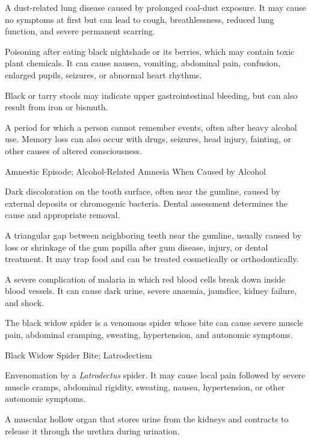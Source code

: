  A dust-related lung disease caused by prolonged coal-dust exposure. It may cause no symptoms at first but can lead to cough, breathlessness, reduced lung function, and severe permanent scarring.

 Poisoning after eating black nightshade or its berries, which may contain toxic plant chemicals. It can cause nausea, vomiting, abdominal pain, confusion, enlarged pupils, seizures, or abnormal heart rhythms.

 Black or tarry stools may indicate upper gastrointestinal bleeding, but can also result from iron or bismuth.

 A period for which a person cannot remember events, often after heavy alcohol use. Memory loss can also occur with drugs, seizures, head injury, fainting, or other causes of altered consciousness.

\synonyms
Amnestic Episode; Alcohol-Related Amnesia When Caused by Alcohol

 Dark discoloration on the tooth surface, often near the gumline, caused by external deposits or chromogenic bacteria. Dental assessment
determines the cause and appropriate removal.

 A triangular gap between neighboring teeth near the gumline, usually caused by loss or shrinkage of the gum papilla after gum disease, injury, or dental treatment. It may trap food and can be treated cosmetically or orthodontically.

 A severe complication of malaria in which red blood cells break down inside blood vessels. It can cause dark urine, severe anaemia, jaundice, kidney failure, and shock.

 The black widow spider is a venomous spider whose bite can cause severe muscle pain, abdominal cramping, sweating, hypertension, and autonomic symptoms.

\synonyms
Black Widow Spider Bite; Latrodectism

 Envenomation by a \textit{Latrodectus} spider. It may cause local pain followed by severe muscle cramps, abdominal rigidity, sweating, nausea, hypertension, or other autonomic symptoms.

 A muscular hollow organ that stores urine from the kidneys and contracts to release it through the urethra during urination.

